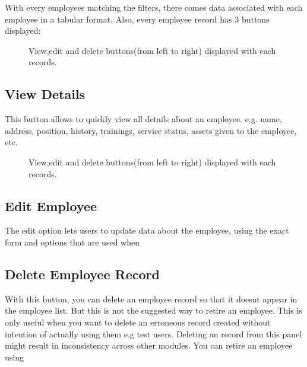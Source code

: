 \documentclass[letterpaper,10pt,english]{sphinxmanual}
\begin{document}
With every employees matching the filters, there comes data associated with each employee in a tabular format. Also, every employee record has 3 buttons displayed:

\begin{figure}[htbp]
\centering
\capstart

\noindent{}
\caption{View,edit and delete buttons(from left to right) displayed with each records.}\label{\detokenize{employee/view:id3}}\end{figure}


\subsection{View Details}
\label{\detokenize{employee/view:view-details}}
This button allows to quickly view all details about an employee. e.g. name, address, position, history, trainings, service status, assets given to the employee, etc.

\begin{figure}[htbp]
\centering
\capstart

\noindent{}
\caption{View,edit and delete buttons(from left to right) displayed with each records.}\label{\detokenize{employee/view:id4}}\end{figure}


\subsection{Edit Employee}
\label{\detokenize{employee/view:edit-employee}}
The edit option lets users to update data about the employee, using the exact form and options that are used when {\hyperref[\detokenize{employee/add:add-employee}]{}}


\subsection{Delete Employee Record}
\label{\detokenize{employee/view:delete-employee-record}}
With this button, you can delete an employee record so that it doesnt appear in the employee list. But this is not the suggested way to retire an employee. This is only useful when you want to delete an erroneous record created without intention of actually using them e.g test users. Deleting an record from this panel might result in inconsistency across other modules. You can retire an employee using 
\end{document}
